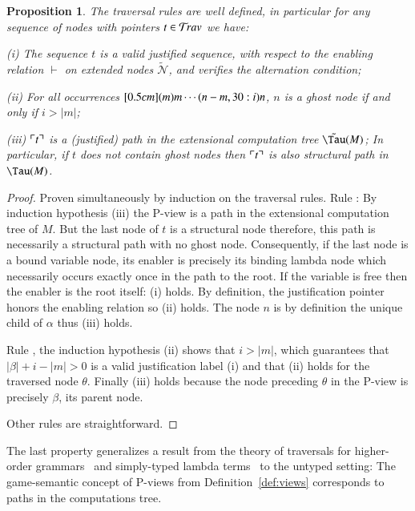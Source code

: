 \documentclass{elsarticle}
\def\shortproof{\begin{proof}}
\def\endshortproof{\end{proof}}
\theoremstyle{plain}
\newtheorem{proposition}[theorem]{Proposition}
\theoremstyle{definition}
\theoremstyle{remark}
\newcommand\Nodes{\mathcal{N}}%
\newcommand{\ghostvar}{\theta}
\newcommand\ExtendedNodes{\tilde{\Nodes}}
\newcommand{\enables}{\vdash} %
\newcommand{\ctree}{\Tau} %
\newcommand{\exttree}{\tilde{\Tau}} %
\begin{document}
\begin{proposition}
\label{prop:ulctrav_welldefined_pathview}
The traversal rules are well defined, in particular for any sequence of nodes with pointers $t\in \mathcal{T}\!rav$ we have:
\begin{compactitem}
\item[(i)] The sequence $t$ is a valid justified sequence, with respect to
the enabling relation $\enables$ on extended nodes $\ExtendedNodes$, and verifies the alternation condition;
\item[(ii)] For all occurrences $\Pstr[0.5cm]{(m){m} \cdots (n-m,30:i){n}}$, $n$ is a ghost node if and only if $i > |m|$;
\item[(iii)] $\ulcorner t \urcorner$ is a (justified) path in the extensional computation tree $\exttree(M)$;
In particular, if $t$ does not contain ghost nodes then $\ulcorner t \urcorner$ is also structural path in $\ctree(M)$.
\end{compactitem}
\end{proposition}
\shortproof
Proven simultaneously by induction on the traversal rules.
Rule : By induction hypothesis (iii) the P-view is a path in the extensional computation tree of $M$. But the last node of $t$ is a structural node therefore, this path is necessarily a structural path with no ghost node. Consequently, if the last node is a bound variable node, its enabler is precisely its binding lambda node which necessarily occurs exactly once in the path to the root. If the variable is free then the enabler is the root itself: (i) holds. By definition, the justification pointer honors the enabling relation so (ii) holds. The node $n$ is by definition the unique child of $\alpha$ thus (iii) holds.

Rule \rulenamet{Lam^\ghostvar}, the induction hypothesis (ii) shows that $i>|m|$, which guarantees that $|\beta|+i-|m|>0$ is a valid justification label (i) and that (ii) holds for the traversed node $\ghostvar$.
Finally (iii) holds because the node preceding $\ghostvar$ in the P-view is precisely $\beta$, its parent node.

Other rules are straightforward.
\endshortproof

The last property generalizes a result from the theory of traversals for higher-order grammars~\cite{OngLics2006} and simply-typed lambda terms~\cite[Proposition 4.29]{BlumPhd} to the untyped setting: The game-semantic concept of P-views from Definition~\ref{def:views} corresponds to paths in the computations tree.
\end{document}
